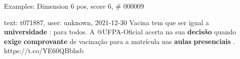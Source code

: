 \begin{frame}{Examples: Dimension 6 pos, score 6, \# 000009}
\footnotesize
\begin{exampleblock}{text: t071887, user: unknown, 2021-12-30}
Vacina tem que ser igual a \textbf{universidade} : para todos. A @UFPA-Oficial 
acerta na sua \textbf{decisão} quando \textbf{exige} \textbf{comprovante} de 
vacinação para a matrícula nas \textbf{aulas} \textbf{presenciais} . 
https://t.co/YE60QBbhsb 
\end{exampleblock}
\end{frame}
